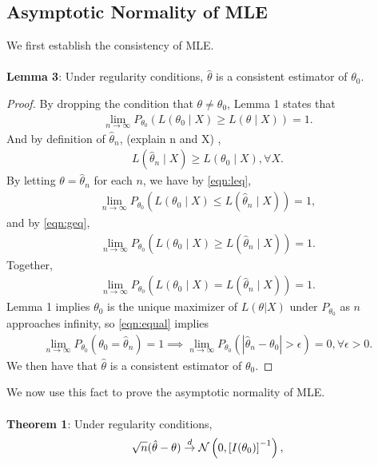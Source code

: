 \subsection{Asymptotic Normality of MLE}
We first establish the consistency of MLE.\\\\
\textbf{Lemma 3}: Under regularity conditions, $\hat{\theta}$ is a consistent estimator of $\theta_0$.
\begin{proof}
By dropping the condition that $\theta\neq\theta_0$, Lemma 1 states that
\begin{align}
\lim_{n\to\infty}P_{\theta_0}\left( L(\theta_0 \mid X) \geq L(\theta \mid X) \right) = 1. \label{eqn:geq}
\end{align}
And by definition of $\hat{\theta}_n$, \bred (explain n and X) \ered,
\begin{align}
L(\hat{\theta}_n \mid X) \geq L(\theta_0 \mid X), \forall X. \label{eqn:leq}
\end{align}
By letting $\theta = \hat{\theta}_n$ for each $n$, we have by \cref{eqn:leq},
\begin{align}
\lim_{n\to\infty}P_{\theta_0}\left( L(\theta_0 \mid X) \leq L(\hat{\theta}_n \mid X) \right) = 1,
\end{align}
and by \cref{eqn:geq},
\begin{align}
\lim_{n\to\infty}P_{\theta_0}\left( L(\theta_0 \mid X) \geq L(\hat{\theta}_n \mid X) \right) = 1.
\end{align}
Together, 
\begin{align}
\lim_{n\to\infty}P_{\theta_0}\left( L(\theta_0 \mid X) = L(\hat{\theta}_n \mid X) \right) = 1. \label{eqn:equal}
\end{align}
Lemma 1 implies $\theta_0$ is the unique maximizer of $L(\theta|X)$ under $P_{\theta_0}$ as $n$ approaches infinity, so \cref{eqn:equal} implies 
\begin{align}
\lim_{n\to\infty}P_{\theta_0}(\theta_0 = \hat{\theta}_n) = 1 \implies \lim_{n\to\infty}P_{\theta_0}\left( \left| \hat{\theta}_n - \theta_0 \right| > \epsilon \right) = 0, \forall \epsilon > 0.
\end{align}
We then have that $\hat{\theta}$ is a consistent estimator of $\theta_0$.
\end{proof}
$ $\\
We now use this fact to prove the asymptotic normality of MLE.\\\\
\textbf{Theorem 1}: Under regularity conditions, 
\begin{align}
\sqrt{n}(\hat{\theta} - \theta) \overset{d}{\rightarrow} \mathcal{N}\left(0, \left[ I(\theta_0) \right]^{-1}\right),
\end{align}
